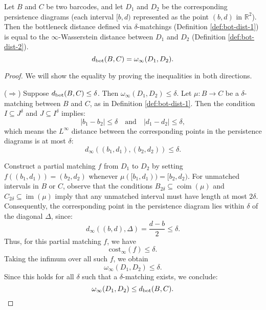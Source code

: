 \begin{proposition}
    Let $B$ and $C$ be two barcodes, and let $D_1$ and $D_2$ be the corresponding persistence diagrams (each interval $[b,d)$ represented as the point $(b,d)$ in $\mathbb{R}^2$). Then the bottleneck distance defined via $\delta$-matchings (Definition \ref{def:bot-dist-1}) is equal to the $\infty$-Wasserstein distance between $D_1$ and $D_2$ (Definition \ref{def:bot-dist-2}).
    \begin{equation}
        d_{\operatorname{bot}}(B, C) = \omega_\infty(D_1, D_2).
    \end{equation}
\end{proposition}
\begin{proof}
    We will show the equality by proving the inequalities in both directions.

    ($\Rightarrow$) Suppose $d_{\operatorname{bot}}(B, C) \leq \delta$. Then $\omega_\infty(D_1, D_2) \leq \delta$. Let $\mu: B \to C$ be a $\delta$-matching between $B$ and $C$, as in Definition \ref{def:bot-dist-1}. Then the condition $I \subseteq J^\delta$ and $J \subseteq I^\delta$ implies:
    \begin{equation}
        |b_1 - b_2| \leq \delta \quad \text{and} \quad |d_1 - d_2| \leq \delta,
    \end{equation}
    which means the $L^\infty$ distance between the corresponding points in the persistence diagrams is at most $\delta$:
    \begin{equation}
        d_\infty((b_1,d_1), (b_2,d_2)) \leq \delta.
    \end{equation}

    Construct a partial matching $f$ from $D_1$ to $D_2$ by setting $f((b_1,d_1)) = (b_2,d_2)$ whenever $\mu([b_1,d_1)) = [b_2,d_2)$. For unmatched intervals in $B$ or $C$, observe that the conditions $B_{2\delta} \subseteq \operatorname{coim}(\mu)$ and $C_{2\delta} \subseteq \operatorname{im}(\mu)$ imply that any unmatched interval must have length at most $2\delta$. Consequently, the corresponding point in the persistence diagram lies within $\delta$ of the diagonal $\Delta$, since:
    \begin{equation}
        d_\infty((b,d), \Delta) = \frac{d-b}{2} \leq \delta.
    \end{equation}
    Thus, for this partial matching $f$, we have
    \begin{equation}
        \mathrm{cost}_\infty(f) \leq \delta.
    \end{equation}
    Taking the infimum over all such $f$, we obtain
    \begin{equation}
        \omega_\infty(D_1, D_2) \leq \delta.
    \end{equation}
    Since this holds for all $\delta$ such that a $\delta$-matching exists, we conclude:
    \begin{equation}
        \omega_\infty(D_1, D_2) \leq d_{\operatorname{bot}}(B, C).
    \end{equation}


\end{proof}
